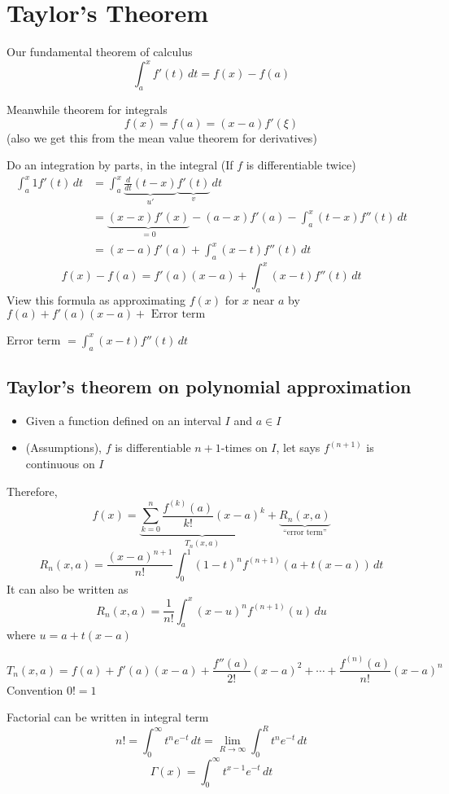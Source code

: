 \chapter{Taylor's Theorem}

\begin{example*}
  Our fundamental theorem of calculus
  \[\int_a^x f'(t)\,dt = f(x) - f(a)\]

  Meanwhile theorem for integrals
  \[f(x) = f(a) = (x-a)f'(\xi)\]
  (also we get this from the mean value theorem for derivatives)

  Do an integration by parts, in the integral (If $f$ is differentiable twice)
  \begin{align*}
    \int_a^x 1 f'(t)\, dt &= \int_a^x \underbrace{\frac{d}{dt}(t-x)}_{u'}\underbrace{f'(t)}_v\, dt \\
    &= \underbrace{(x-x)f'(x)}_{=0} - (a-x)f'(a) - \int_a^x (t-x)f''(t)\, dt \\
    &= (x-a)f'(a) + \int_a^x (x-t)f''(t)\, dt
  \end{align*}
  \[f(x) - f(a) = f'(a)(x-a) + \int_a^x(x-t)f''(t)\, dt\]
  View this formula as approximating $f(x)$ for $x$ near $a$ by $f(a) + f'(a)(x-a) + \text{ Error term}$

  Error term $\displaystyle = \int_a^x (x-t) f''(t)\, dt$
\end{example*}

\section{Taylor's theorem on polynomial approximation}

\begin{itemize}
  \item Given a function defined on an interval $I$ and $a \in I$
  \item (Assumptions), $f$ is differentiable $n + 1$-times on $I$, let says $f^{(n+1)}$ is continuous on $I$
\end{itemize}
Therefore, 
\[f(x) = \underbrace{\sum_{k = 0}^{n} \frac{f^{(k)}(a)}{k!}(x-a)^k}_{T_n(x, a)} + \underbrace{R_n(x, a)}_{\text{``error term''}}\]
\[R_n(x, a) = \frac{(x-a)^{n+1}}{n!}\int_0^1(1-t)^nf^{(n+1)}(a + t(x-a))\, dt\]
It can also be written as 
\[R_n(x, a) = \frac{1}{n!}\int_a^x (x-u)^nf^{(n+1)}(u)\, du\]
where $u = a + t(x-a)$

\[T_n(x, a) = f(a) + f'(a)(x-a) + \frac{f''(a)}{2!}(x-a)^2 + \cdots + \frac{f^{(n)}(a)}{n!}(x-a)^n\]
Convention $0! = 1$

Factorial can be written in integral term
\[n! = \int_0^\infty t^ne^{-t}\, dt = \lim\limits_{R\to\infty} \int_0^{R}t^ne^{-t}\, dt\]
\[\Gamma(x) = \int_0^\infty t^{x-1}e^{-t}\, dt\]


